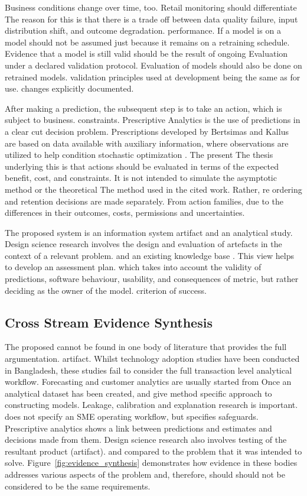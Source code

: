 \documentclass[a4paper,11pt,oneside]{book}
\theoremstyle{plain}
\theoremstyle{definition}
\theoremstyle{remark}
\begin{document}
Business conditions change over time, too. Retail monitoring should differentiate The reason for this is that there is a trade off between data quality failure, input distribution shift, and outcome degradation. performance. If a model is on a model should not be assumed just because it remains on a retraining schedule. Evidence that a model is still valid should be the result of ongoing Evaluation under a declared validation protocol. Evaluation of models should also be done on retrained models. validation principles used at development being the same as for use. changes explicitly documented.

After making a prediction, the subsequent step is to take an action, which is subject to business. constraints. Prescriptive Analytics is the use of predictions in a clear cut decision problem. Prescriptions developed by Bertsimas and Kallus are based on data available with auxiliary information, where observations are utilized to help condition stochastic optimization \cite{bertsimas2020prescriptive}. The present The thesis underlying this is that actions should be evaluated in terms of the expected benefit, cost, and constraints. It is not intended to simulate the asymptotic method or the theoretical The method used in the cited work. Rather, re ordering and retention decisions are made separately. From action families, due to the differences in their outcomes, costs, permissions and uncertainties.

The proposed system is an information system artifact and an analytical study. Design science research involves the design and evaluation of artefacts in the context of a relevant problem. and an existing knowledge base \cite{hevner2004design}. This view helps to develop an assessment plan. which takes into account the validity of predictions, software behaviour, usability, and consequences of metric, but rather deciding as the owner of the model. criterion of success.

\subsection{Cross Stream Evidence Synthesis}

The proposed cannot be found in one body of literature that provides the full argumentation. artifact. Whilst technology adoption studies have been conducted in Bangladesh, these studies fail to consider the full transaction level analytical workflow. Forecasting and customer analytics are usually started from Once an analytical dataset has been created, and give method specific approach to constructing models. Leakage, calibration and explanation research is important. does not specify an SME operating workflow, but specifies safeguards. Prescriptive analytics shows a link between predictions and estimates and decisions made from them. Design science research also involves testing of the resultant product (artifact). and compared to the problem that it was intended to solve. Figure~\ref{fig:evidence_synthesis} demonstrates how evidence in these bodies addresses various aspects of the problem and, therefore, should should not be considered to be the same requirements.
\end{document}
